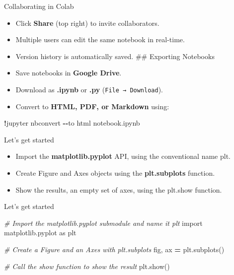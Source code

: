 \documentclass[
  ignorenonframetext,
]{beamer}
\newenvironment{Shaded}{\begin{snugshade}}{\end{snugshade}}
\newcommand{\CommentTok}[1]{\textcolor[rgb]{0.56,0.35,0.01}{\textit{#1}}}
\newcommand{\ImportTok}[1]{#1}
\newcommand{\NormalTok}[1]{#1}
\newcommand{\OperatorTok}[1]{\textcolor[rgb]{0.81,0.36,0.00}{\textbf{#1}}}
\providecommand{\tightlist}{%
  \setlength{\itemsep}{0pt}\setlength{\parskip}{0pt}}
\begin{document}
\begin{frame}[fragile]{Collaborating in Colab}
\label{collaborating-in-colab}
\begin{itemize}
\item
  Click \textbf{Share} (top right) to invite collaborators.
\item
  Multiple users can edit the same notebook in real-time.
\item
  Version history is automatically saved. \#\# Exporting Notebooks
\item
  Save notebooks in \textbf{Google Drive}.
\item
  Download as \textbf{.ipynb} or \textbf{.py}
  (\texttt{File\ →\ Download}).
\item
  Convert to \textbf{HTML, PDF, or Markdown} using:
\end{itemize}

\begin{Shaded}
\begin{Highlighting}[]
\OperatorTok{!}\NormalTok{jupyter nbconvert }\OperatorTok{{-}{-}}\NormalTok{to html notebook.ipynb}
\end{Highlighting}
\end{Shaded}
\end{frame}

\begin{frame}{Let's get started}
\label{lets-get-started}
\begin{itemize}
\tightlist
\item
  Import the \textbf{matplotlib.pyplot} API, using the conventional name
  plt.
\item
  Create Figure and Axes objects using the \textbf{plt.subplots}
  function.
\item
  Show the results, an empty set of axes, using the plt.show function.
\end{itemize}
\end{frame}

\begin{frame}[fragile]{Let's get started}
\label{lets-get-started-1}
\begin{Shaded}
\begin{Highlighting}[]
\CommentTok{\# Import the matplotlib.pyplot submodule and name it plt}
\ImportTok{import}\NormalTok{ matplotlib.pyplot }\ImportTok{as}\NormalTok{ plt}

\CommentTok{\# Create a Figure and an Axes with plt.subplots}
\NormalTok{fig, ax }\OperatorTok{=}\NormalTok{ plt.subplots()}

\CommentTok{\# Call the show function to show the result}
\NormalTok{plt.show()}
\end{Highlighting}
\end{Shaded}
\end{frame}
\end{document}
